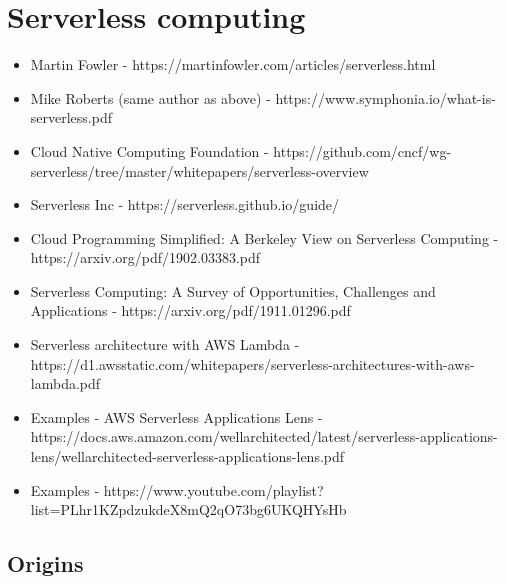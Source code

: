 \chapter{Serverless computing}

\begin{itemize}
    \item Martin Fowler - https://martinfowler.com/articles/serverless.html
    \item Mike Roberts (same author as above) - https://www.symphonia.io/what-is-serverless.pdf
    \item Cloud Native Computing Foundation - https://github.com/cncf/wg-serverless/tree/master/whitepapers/serverless-overview 
    \item Serverless Inc - https://serverless.github.io/guide/
    \item Cloud Programming Simplified: A Berkeley View on Serverless Computing - https://arxiv.org/pdf/1902.03383.pdf
    \item Serverless Computing: A Survey of Opportunities, Challenges and Applications - https://arxiv.org/pdf/1911.01296.pdf
    \item Serverless architecture with AWS Lambda - https://d1.awsstatic.com/whitepapers/serverless-architectures-with-aws-lambda.pdf
    \item Examples - AWS Serverless Applications Lens - https://docs.aws.amazon.com/wellarchitected/latest/serverless-applications-lens/wellarchitected-serverless-applications-lens.pdf
    \item Examples - https://www.youtube.com/playlist?list=PLhr1KZpdzukdeX8mQ2qO73bg6UKQHYsHb
\end{itemize}

\section*{Origins}

